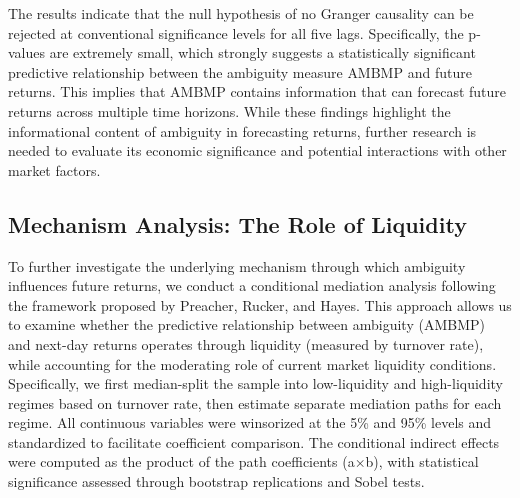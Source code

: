 \documentclass[preprint,12pt,authoryear]{elsarticle}
\begin{document}
The results indicate that the null hypothesis of no Granger causality can be rejected at conventional significance levels for all five lags.  Specifically, the p-values are extremely small, which strongly suggests a statistically significant predictive relationship between the ambiguity measure $ \text{AMBMP} $ and future returns.  This implies that $ \text{AMBMP} $ contains information that can forecast future returns across multiple time horizons.   While these findings highlight the informational content of ambiguity in forecasting returns, further research is needed to evaluate its economic significance and potential interactions with other market factors.

\subsection{Mechanism Analysis: The Role of Liquidity}
To further investigate the underlying mechanism through which ambiguity influences future returns, we conduct a conditional mediation analysis following the framework proposed by Preacher, Rucker, and Hayes\cite{preacher2007moderated}. This approach allows us to examine whether the predictive relationship between ambiguity (AMBMP) and next-day returns operates through liquidity (measured by turnover rate), while accounting for the moderating role of current market liquidity conditions. Specifically, we first median-split the sample into low-liquidity and high-liquidity regimes based on turnover rate, then estimate separate mediation paths for each regime. All continuous variables were winsorized at the 5\% and 95\% levels and standardized to facilitate coefficient comparison. The conditional indirect effects were computed as the product of the path coefficients (a×b), with statistical significance assessed through bootstrap replications and Sobel tests.
\end{document}
